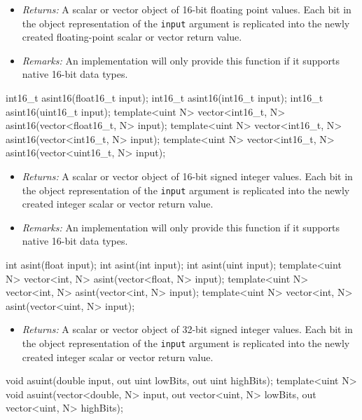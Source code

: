 \begin{itemize}
  \item \textit{Returns:} A scalar or vector object of 16-bit floating point
  values. Each bit in the object representation of the \texttt{input} argument
  is replicated into the newly created floating-point scalar or vector return
  value.
  \item \textit{Remarks:} An implementation will only provide this function if
  it supports native 16-bit data types.
\end{itemize}

\begin{HLSL}
int16_t asint16(float16_t input);
int16_t asint16(int16_t input);
int16_t asint16(uint16_t input);
template<uint N> vector<int16_t, N> asint16(vector<float16_t, N> input);
template<uint N> vector<int16_t, N> asint16(vector<int16_t, N> input);
template<uint N> vector<int16_t, N> asint16(vector<uint16_t, N> input);
\end{HLSL}

\begin{itemize}
  \item \textit{Returns:} A scalar or vector object of 16-bit signed integer
  values. Each bit in the object representation of the \texttt{input} argument
  is replicated into the newly created integer scalar or vector return value.
  \item \textit{Remarks:} An implementation will only provide this function if
  it supports native 16-bit data types.
\end{itemize}

\begin{HLSL}
int asint(float input);
int asint(int input);
int asint(uint input);
template<uint N> vector<int, N> asint(vector<float, N> input);
template<uint N> vector<int, N> asint(vector<int, N> input);
template<uint N> vector<int, N> asint(vector<uint, N> input);
\end{HLSL}

\begin{itemize}
  \item \textit{Returns:} A scalar or vector object of 32-bit signed integer
  values. Each bit in the object representation of the \texttt{input} argument
  is replicated into the newly created integer scalar or vector return value.
\end{itemize}

\begin{HLSL}
void asuint(double input, out uint lowBits, out uint highBits);
template<uint N> void asuint(vector<double, N> input, out vector<uint, N> lowBits, out vector<uint, N> highBits);
\end{HLSL}

